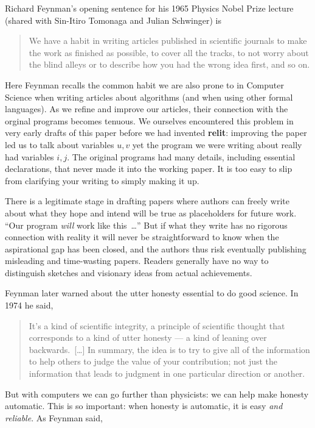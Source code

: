 \documentclass[12pt]{article}
\def\name#1{\textbf{#1}}
\begin{document}
Richard Feynman's opening sentence for his 1965 Physics Nobel Prize lecture~\cite{feynmanprize} (shared with Sin-Itiro Tomonaga and Julian Schwinger) is

\begin{quote}\startquote We have a habit in writing articles published in scientific journals to make the work as finished as possible, to cover all the tracks, to not worry about the blind alleys or to describe how you had the wrong idea first, and so on.\quoteend
\end{quote} 

Here Feynman recalls the common habit we are also prone to in Computer Science when writing articles about algorithms (and when using other formal languages). As we refine and improve our articles, their connection with the orginal programs becomes tenuous. We ourselves encountered this problem in very early drafts of this paper before we had invented \name{relit}: improving the paper led us to talk about variables $u,v$ yet the program we were writing about really had variables $i,j$. The original programs had many details, including essential declarations, that never made it into the working paper. It is too easy to slip from clarifying your writing to simply making it up.

There is a legitimate stage in drafting papers where authors can freely write about what they hope and intend will be true as placeholders for future work. ``Our program \emph{will\/} work like this~\ldots'' But if what they write has no rigorous connection with reality it will never be straightforward to know when the aspirational gap has been closed, and the authors thus risk eventually publishing misleading and time-wasting papers. Readers generally have no way to distinguish sketches and visionary ideas from actual achievements. 

Feynman \cite{feynman} later warned about the utter honesty essential to do good science. In 1974 he said, 

\begin{quote}\startquote 
It's a kind of scientific integrity, a principle of scientific thought that corresponds to a kind of utter honesty --- a kind of leaning over backwards.~[\ldots] In summary, the idea is to try to give all of the information to help others to judge the value of your contribution; not just the information that leads to judgment in one particular direction or another.\quoteend
\end{quote} 

But with computers we can go further than physicists: we can help make honesty automatic. This is so important: when honesty is automatic, it is easy \emph{and reliable}. As Feynman said, 
\end{document}
